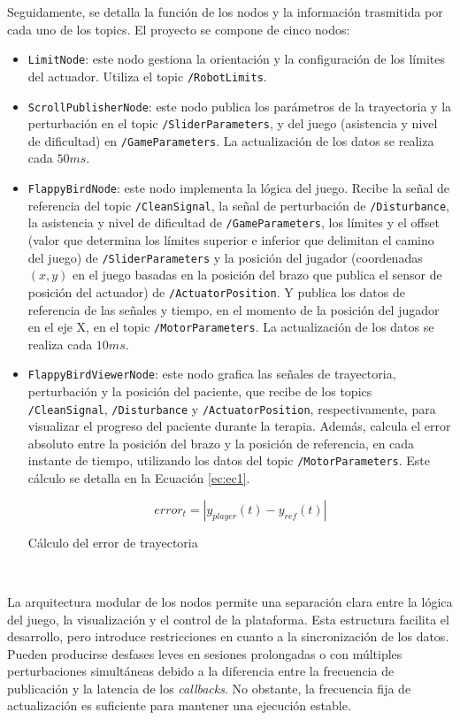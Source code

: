 Seguidamente, se detalla la función de los nodos y la información trasmitida por cada uno de los topics.
El proyecto se compone de cinco nodos:
\begin{itemize}
    \item \verb|LimitNode|: este nodo gestiona la orientación y la configuración de los límites del actuador. Utiliza el topic \verb|/RobotLimits|.
	\item \verb|ScrollPublisherNode|: este nodo publica los parámetros de la trayectoria y la perturbación en el topic \verb|/SliderParameters|, y del juego (asistencia y nivel de dificultad) en \verb|/GameParameters|. La actualización de los datos se realiza cada $50 ms$.
	\item \verb|FlappyBirdNode|: este nodo implementa la lógica del juego. Recibe la señal de referencia del topic \verb|/CleanSignal|, la señal de perturbación de \verb|/Disturbance|, la asistencia y nivel de dificultad de \verb|/GameParameters|, los límites y el offset (valor que determina los límites superior e inferior que delimitan el camino del juego) de \verb|/SliderParameters| y la posición del jugador (coordenadas $(x, y)$ en el juego basadas en la posición del brazo que publica el sensor de posición del actuador) de \verb|/ActuatorPosition|. Y publica los datos de referencia de las señales y tiempo, en el momento de la posición del jugador en el eje X, en el topic \verb|/MotorParameters|. La actualización de los datos se realiza cada $10 ms$.
	\item \verb|FlappyBirdViewerNode|: este nodo grafica las señales de trayectoria, perturbación y la posición del paciente, que recibe de los topics \verb|/CleanSignal|, \verb|/Disturbance| y \verb|/ActuatorPosition|, respectivamente, para visualizar el progreso del paciente durante la terapia. Además, calcula el error absoluto entre la posición del brazo y la posición de referencia, en cada instante de tiempo, utilizando los datos del topic \verb|/MotorParameters|. Este cálculo se detalla en la Ecuación \ref{ec:ec1}.
	\begin{myequation}[h]
		\begin{equation}
		error_t = | y_{player}(t) - y_{ref}(t) |
		\nonumber
		\label{ec:ec1}
		\end{equation}
		\caption[Cálculo del error de trayectoria]{Cálculo del error de trayectoria}
	\end{myequation}
\end{itemize}\

La arquitectura modular de los nodos permite una separación clara entre la lógica del juego, la visualización y el control de la plataforma.
Esta estructura facilita el desarrollo, pero introduce restricciones en cuanto a la sincronización de los datos.
Pueden producirse desfases leves en sesiones prolongadas o con múltiples perturbaciones simultáneas debido a la diferencia entre la frecuencia de publicación y la latencia de los \textit{callbacks}.
No obstante, la frecuencia fija de actualización es suficiente para mantener una ejecución estable.\\

